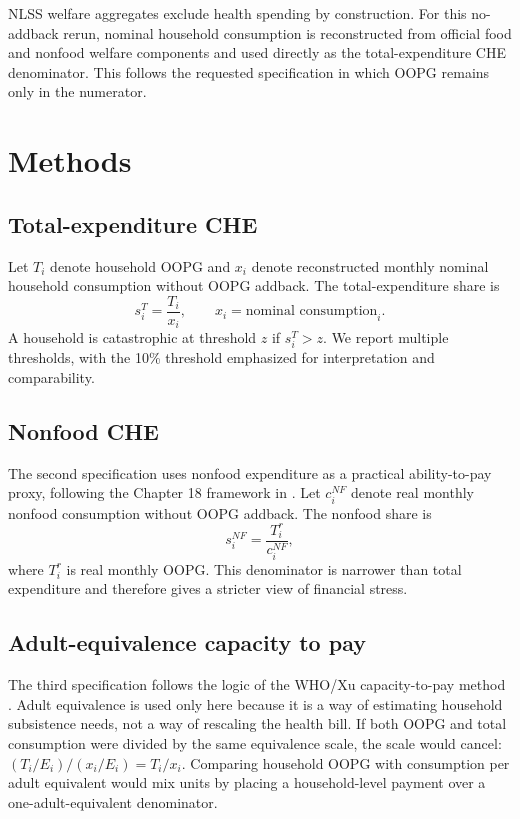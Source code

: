 \documentclass[11pt]{article}
\begin{document}
NLSS welfare aggregates exclude health spending by construction. For this no-addback rerun, nominal household consumption is reconstructed from official food and nonfood welfare components and used directly as the total-expenditure CHE denominator. This follows the requested specification in which OOPG remains only in the numerator.

\section{Methods}

\subsection{Total-expenditure CHE}

Let $T_i$ denote household OOPG and $x_i$ denote reconstructed monthly nominal household consumption without OOPG addback. The total-expenditure share is
\begin{equation}
s_i^T = \frac{T_i}{x_i}, \qquad x_i = \text{nominal consumption}_i.
\end{equation}
A household is catastrophic at threshold $z$ if $s_i^T > z$. We report multiple thresholds, with the 10\% threshold emphasized for interpretation and comparability.

\subsection{Nonfood CHE}

The second specification uses nonfood expenditure as a practical ability-to-pay proxy, following the Chapter 18 framework in \citet{odonnell2008}. Let $c_i^{NF}$ denote real monthly nonfood consumption without OOPG addback. The nonfood share is
\begin{equation}
s_i^{NF} = \frac{T_i^r}{c_i^{NF}},
\end{equation}
where $T_i^r$ is real monthly OOPG. This denominator is narrower than total expenditure and therefore gives a stricter view of financial stress.

\subsection{Adult-equivalence capacity to pay}

The third specification follows the logic of the WHO/Xu capacity-to-pay method \citep{xu2003,xu2005}. Adult equivalence is used only here because it is a way of estimating household subsistence needs, not a way of rescaling the health bill. If both OOPG and total consumption were divided by the same equivalence scale, the scale would cancel: $(T_i/E_i)/(x_i/E_i)=T_i/x_i$. Comparing household OOPG with consumption per adult equivalent would mix units by placing a household-level payment over a one-adult-equivalent denominator.
\end{document}

